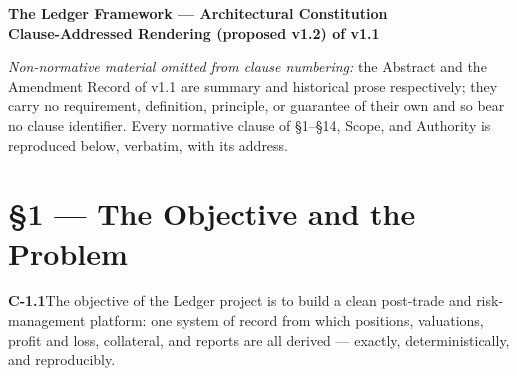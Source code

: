 \documentclass[11pt,a4paper]{article}
\newcommand{\clause}[2]{\par\medskip\noindent\textbf{#1}\hspace{0.6em}#2}
\begin{document}
\begin{center}
\end{center}

\begin{center}
\large\bfseries The Ledger Framework --- Architectural Constitution\\
\normalsize\normalfont Clause-Addressed Rendering (proposed v1.2) of v1.1
\end{center}

\noindent\emph{Non-normative material omitted from clause numbering:} the
Abstract and the Amendment Record of v1.1 are summary and historical prose
respectively; they carry no requirement, definition, principle, or guarantee of
their own and so bear no clause identifier. Every normative clause of
\S1--\S14, Scope, and Authority is reproduced below, verbatim, with its address.

\section*{\S1 --- The Objective and the Problem}

\clause{C-1.1}{The objective of the Ledger project is to build a clean post-trade
and risk-management platform: one system of record from which positions,
valuations, profit and loss, collateral, and reports are all derived --- exactly,
deterministically, and reproducibly.}
\end{document}
